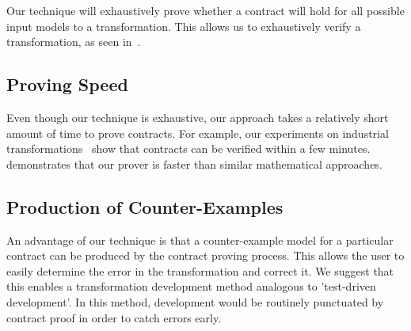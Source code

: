 Our technique will exhaustively prove whether a contract will hold for all
possible input models to a transformation. This allows us to exhaustively verify
a transformation, as seen in~\cite{Lucio2014}.

\subsection{Proving Speed}

 Even though our technique is exhaustive, our approach takes a relatively short
 amount of time to prove contracts. For example, our experiments on industrial
 transformations~\cite{Oakes} show that contracts can be verified within a few
 minutes. \cite{Selim2014} demonstrates that our prover is faster than similar
 mathematical approaches.

\subsection{Production of Counter-Examples}

An advantage of our technique is that a counter-example model for a particular
contract can be produced by the contract proving process. This allows the user
to easily determine the error in the transformation and correct it. We suggest
that this enables a transformation development method analogous to 'test-driven
development'. In this method, development would be routinely punctuated by
contract proof in order to catch errors early.

 
